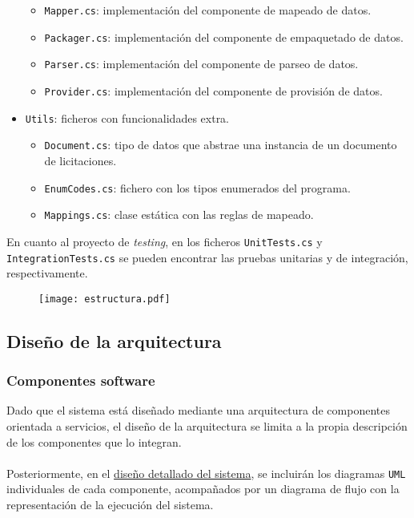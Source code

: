 \begin{itemize}
                \begin{itemize}
                    \item \texttt{Mapper.cs}: implementación del componente de mapeado de datos.
                    \item \texttt{Packager.cs}: implementación del componente de empaquetado de datos.
                    \item \texttt{Parser.cs}: implementación del componente de parseo de datos.
                    \item \texttt{Provider.cs}: implementación del componente de provisión de datos.
                \end{itemize}
            \item \texttt{Utils}: ficheros con funcionalidades extra.
                \begin{itemize}
                    \item \texttt{Document.cs}: tipo de datos que abstrae una instancia de un documento de licitaciones.
                    \item \texttt{EnumCodes.cs}: fichero con los tipos enumerados del programa.
                    \item \texttt{Mappings.cs}: clase estática con las reglas de mapeado.
                \end{itemize}
        \end{itemize}
        
        En cuanto al proyecto de \textit{testing}, en los ficheros \texttt{UnitTests.cs} y \texttt{IntegrationTests.cs} se pueden encontrar las pruebas unitarias y de integración, respectivamente.
        
        \begin{figure}[h]
            \centering
            \texttt{[image: estructura.pdf]}
            \label{fig:estructura}
        \end{figure}
        
    \subsection{Diseño de la arquitectura}
        \subsubsection{Componentes software} \label{subsubsec:componentes}
            Dado que el sistema está diseñado mediante una arquitectura de componentes orientada a servicios, el diseño de la arquitectura se limita a la propia descripción de los componentes que lo integran.
            \\ \\
            Posteriormente, en el \hyperref[subsec:detallado]{diseño detallado del sistema}, se incluirán los diagramas \texttt{UML} individuales de cada componente, acompañados por un diagrama de flujo con la representación de la ejecución del sistema.
            
